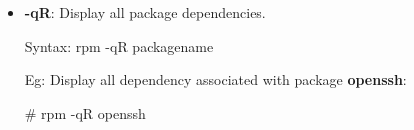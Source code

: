 \begin{flushleft}
\begin{itemize}
		\bigskip
		\bigskip
		\item \textbf{-qR}: Display all package dependencies.
		\bigskip
		\begin{tcolorbox}[breakable,notitle,boxrule=-0pt,colback=pink,colframe=pink]
			\color{black}
			\font=9pt
			Syntax: rpm -qR packagename
			\font=4pt
		\end{tcolorbox}
		Eg: Display all dependency associated with package \textbf{openssh}:
		\bigskip
		\begin{tcolorbox}[breakable,notitle,boxrule=-0pt,colback=black,colframe=black]
			\color{white}
			\font=9pt
			\color{green}
			\# rpm -qR openssh
			\font=4pt
		\end{tcolorbox}


		
	
	\end{itemize}
\end{flushleft}
\newpage


